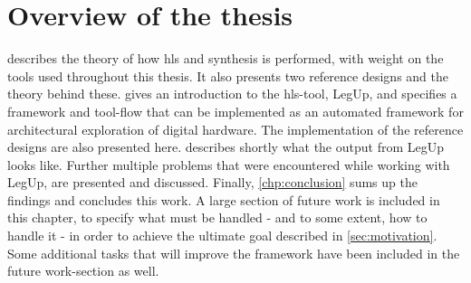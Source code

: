 \section{Overview of the thesis}
 describes the theory of how \gls{hls} and synthesis is performed, with weight on the tools used throughout this thesis. It also presents two reference designs and the theory behind these.  gives an introduction to the \gls{hls}-tool, LegUp, and specifies a framework and tool-flow that can be implemented as an automated framework for architectural exploration of digital hardware. The implementation of the reference designs are also presented here.  describes shortly what the output from LegUp looks like. Further multiple problems that were encountered while working with LegUp, are presented and discussed. Finally, \cref{chp:conclusion} sums up the findings and concludes this work. A large section of future work is included in this chapter, to specify what must be handled - and to some extent, how to handle it - in order to achieve the ultimate goal described in \cref{sec:motivation}. Some additional tasks that will improve the framework have been included in the future work-section as well.
